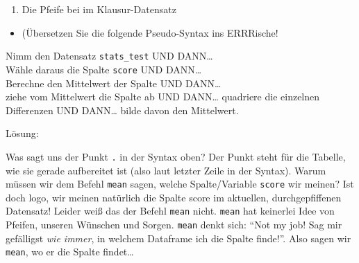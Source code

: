 \documentclass[12pt,ngerman,]{book}
\makeatletter
\newenvironment{Shaded}{\begin{snugshade}}{\end{snugshade}}
\newcommand{\KeywordTok}[1]{\textcolor[rgb]{0.13,0.29,0.53}{\textbf{{#1}}}}
\newcommand{\DataTypeTok}[1]{\textcolor[rgb]{0.13,0.29,0.53}{{#1}}}
\newcommand{\DecValTok}[1]{\textcolor[rgb]{0.00,0.00,0.81}{{#1}}}
\newcommand{\StringTok}[1]{\textcolor[rgb]{0.31,0.60,0.02}{{#1}}}
\newcommand{\CommentTok}[1]{\textcolor[rgb]{0.56,0.35,0.01}{\textit{{#1}}}}
\newcommand{\NormalTok}[1]{{#1}}
\providecommand{\tightlist}{%
  \setlength{\itemsep}{0pt}\setlength{\parskip}{0pt}}
\newenvironment{kframe}{%
\medskip{}
\setlength{\fboxsep}{.8em}
 \def\at@end@of@kframe{}%
 \ifinner\ifhmode%
  \def\at@end@of@kframe{\end{minipage}}%
  \begin{minipage}{\columnwidth}%
 \fi\fi%
 \def\FrameCommand##1{\hskip\@totalleftmargin \hskip-\fboxsep
 \colorbox{shadecolor}{##1}\hskip-\fboxsep
     \hskip-\linewidth \hskip-\@totalleftmargin \hskip\columnwidth}%
 \MakeFramed {\advance\hsize-\width
   \@totalleftmargin\z@ \linewidth\hsize
   \@setminipage}}%
 {\par\unskip\endMakeFramed%
 \at@end@of@kframe}
\renewenvironment{Shaded}{\begin{kframe}}{\end{kframe}}
\theoremstyle{definition}
\theoremstyle{definition}
\theoremstyle{remark}
\let\BeginKnitrBlock\begin \let\EndKnitrBlock\end
\makeatother
\begin{document}
\begin{enumerate}
\def\labelenumi{\arabic{enumi}.}
\setcounter{enumi}{2}
\tightlist
\item
  Die Pfeife bei im Klausur-Datensatz
\end{enumerate}

\begin{itemize}
\tightlist
\item
  (Übersetzen Sie die folgende Pseudo-Syntax ins ERRRische!
\end{itemize}

\BeginKnitrBlock{rmdpseudocode}
Nimm den Datensatz \texttt{stats\_test} UND DANN\ldots{}\\
Wähle daraus die Spalte \texttt{score} UND DANN\ldots{}\\
Berechne den Mittelwert der Spalte UND DANN\ldots{}\\
ziehe vom Mittelwert die Spalte ab UND DANN\ldots{} quadriere die
einzelnen Differenzen UND DANN\ldots{} bilde davon den Mittelwert.
\EndKnitrBlock{rmdpseudocode}

Lösung:

\begin{Shaded}
\end{Shaded}

Was sagt uns der Punkt \texttt{.} in der Syntax oben? Der Punkt steht
für die Tabelle, wie sie gerade aufbereitet ist (also laut letzter Zeile
in der Syntax). Warum müssen wir dem Befehl \texttt{mean} sagen, welche
Spalte/Variable \texttt{score} wir meinen? Ist doch logo, wir meinen
natürlich die Spalte score im aktuellen, durchgepfiffenen Datensatz!
Leider weiß das der Befehl \texttt{mean} nicht. \texttt{mean} hat
keinerlei Idee von Pfeifen, unseren Wünschen und Sorgen. \texttt{mean}
denkt sich: ``Not my job! Sag mir gefälligst \emph{wie immer}, in
welchem Dataframe ich die Spalte finde!''. Also sagen wir \texttt{mean},
wo er die Spalte findet\ldots{}
\end{document}
